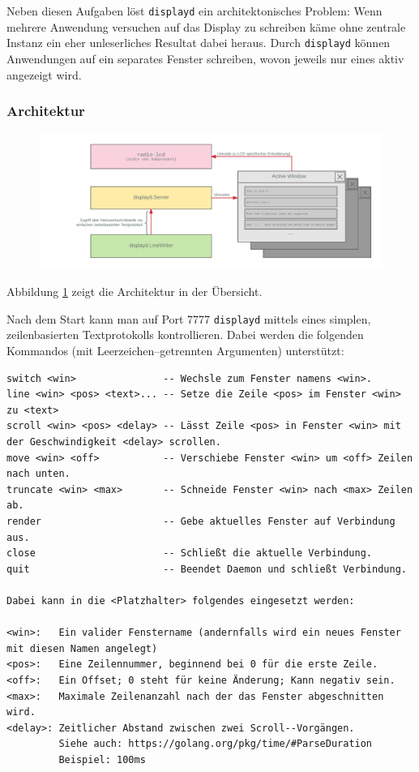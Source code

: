 \documentclass[11pt,ngerman,toc=listof,index=totoc]{scrreprt}
\begin{document}
Neben diesen Aufgaben löst \texttt{displayd} ein architektonisches
Problem: Wenn mehrere Anwendung versuchen auf das Display zu schreiben
käme ohne zentrale Instanz ein eher unleserliches Resultat dabei heraus.
Durch \texttt{displayd} können Anwendungen auf ein separates Fenster
schreiben, wovon jeweils nur eines aktiv angezeigt wird.

\subsubsection{Architektur}\label{architektur}

\begin{figure}[h!]
  \centering
  \includegraphics[width=1.0\textwidth]{images/eulenfunk-displayd.png}
  \caption{}
  \label{eulenfunk-displayd}
\end{figure}

Abbildung \ref{eulenfunk-displayd} zeigt die Architektur in der
Übersicht.

Nach dem Start kann man auf Port 7777 \texttt{displayd} mittels eines
simplen, zeilenbasierten Textprotokolls kontrollieren. Dabei werden die
folgenden Kommandos (mit Leerzeichen--getrennten Argumenten)
unterstützt:

\begin{verbatim}
switch <win>               -- Wechsle zum Fenster namens <win>.
line <win> <pos> <text>... -- Setze die Zeile <pos> im Fenster <win> zu <text>
scroll <win> <pos> <delay> -- Lässt Zeile <pos> in Fenster <win> mit der Geschwindigkeit <delay> scrollen.
move <win> <off>           -- Verschiebe Fenster <win> um <off> Zeilen nach unten.
truncate <win> <max>       -- Schneide Fenster <win> nach <max> Zeilen ab.
render                     -- Gebe aktuelles Fenster auf Verbindung aus.
close                      -- Schließt die aktuelle Verbindung.
quit                       -- Beendet Daemon und schließt Verbindung.

Dabei kann in die <Platzhalter> folgendes eingesetzt werden:

<win>:   Ein valider Fenstername (andernfalls wird ein neues Fenster mit diesen Namen angelegt)
<pos>:   Eine Zeilennummer, beginnend bei 0 für die erste Zeile.
<off>:   Ein Offset; 0 steht für keine Änderung; Kann negativ sein.
<max>:   Maximale Zeilenanzahl nach der das Fenster abgeschnitten wird.
<delay>: Zeitlicher Abstand zwischen zwei Scroll--Vorgängen.
         Siehe auch: https://golang.org/pkg/time/#ParseDuration
         Beispiel: 100ms
\end{verbatim}
\end{document}
